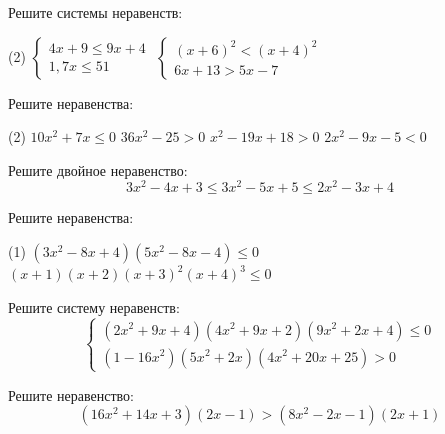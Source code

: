 \begin{class}[number=3]
	\begin{listofex}
		\item Решите системы неравенств:
		\begin{tasks}(2)
			\task \( \begin{cases} 4x+9 \le 9x+4 \\ 1,7x \le 51 \end{cases} \)
			\task \( \begin{cases} (x+6)^2 < (x+4)^2 \\ 6x+13 > 5x-7 \end{cases} \)
		\end{tasks}
		\item Решите неравенства:
		\begin{tasks}(2)
			\task \( 10x^2+7x \le 0 \)
			\task \( 36x^2-25 > 0 \)
			\task \( x^2-19x+18 > 0 \)
			\task \( 2x^2-9x-5 < 0 \)
		\end{tasks}
		\item Решите двойное неравенство: \[ 3x^2-4x+3 \le 3x^2-5x+5 \le 2x^2-3x+4 \]
		\item Решите неравенства:
		\begin{tasks}(1)
			\task \( (3x^2-8x+4)(5x^2-8x-4) \le 0 \)
			\task \( (x+1)(x+2)(x+3)^2(x+4)^3 \le 0 \)
		\end{tasks}
		
		\item Решите систему неравенств: \[ \begin{cases} (2x^2+9x+4)(4x^2+9x+2)(9x^2+2x+4) \le 0 \\ (1-16x^2)(5x^2+2x)(4x^2+20x+25) > 0 \end{cases} \]
		\item Решите неравенство: \[ (16x^2+14x+3)(2x-1) > (8x^2-2x-1)(2x+1) \]
		
	\end{listofex}
\end{class}

